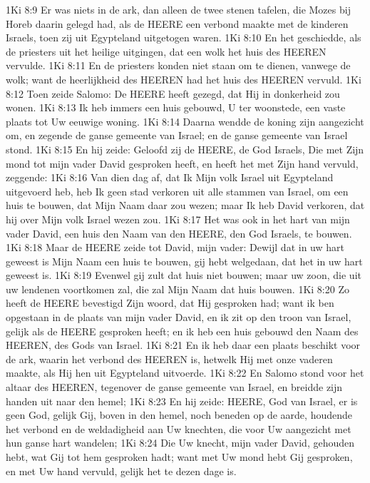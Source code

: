 1Ki 8:9  Er was niets in de ark, dan alleen de twee stenen tafelen, die Mozes bij Horeb daarin gelegd had, als de HEERE een verbond maakte met de kinderen Israels, toen zij uit Egypteland uitgetogen waren.
1Ki 8:10  En het geschiedde, als de priesters uit het heilige uitgingen, dat een wolk het huis des HEEREN vervulde.
1Ki 8:11  En de priesters konden niet staan om te dienen, vanwege de wolk; want de heerlijkheid des HEEREN had het huis des HEEREN vervuld.
1Ki 8:12  Toen zeide Salomo: De HEERE heeft gezegd, dat Hij in donkerheid zou wonen.
1Ki 8:13  Ik heb immers een huis gebouwd, U ter woonstede, een vaste plaats tot Uw eeuwige woning.
1Ki 8:14  Daarna wendde de koning zijn aangezicht om, en zegende de ganse gemeente van Israel; en de ganse gemeente van Israel stond.
1Ki 8:15  En hij zeide: Geloofd zij de HEERE, de God Israels, Die met Zijn mond tot mijn vader David gesproken heeft, en heeft het met Zijn hand vervuld, zeggende:
1Ki 8:16  Van dien dag af, dat Ik Mijn volk Israel uit Egypteland uitgevoerd heb, heb Ik geen stad verkoren uit alle stammen van Israel, om een huis te bouwen, dat Mijn Naam daar zou wezen; maar Ik heb David verkoren, dat hij over Mijn volk Israel wezen zou.
1Ki 8:17  Het was ook in het hart van mijn vader David, een huis den Naam van den HEERE, den God Israels, te bouwen.
1Ki 8:18  Maar de HEERE zeide tot David, mijn vader: Dewijl dat in uw hart geweest is Mijn Naam een huis te bouwen, gij hebt welgedaan, dat het in uw hart geweest is.
1Ki 8:19  Evenwel gij zult dat huis niet bouwen; maar uw zoon, die uit uw lendenen voortkomen zal, die zal Mijn Naam dat huis bouwen.
1Ki 8:20  Zo heeft de HEERE bevestigd Zijn woord, dat Hij gesproken had; want ik ben opgestaan in de plaats van mijn vader David, en ik zit op den troon van Israel, gelijk als de HEERE gesproken heeft; en ik heb een huis gebouwd den Naam des HEEREN, des Gods van Israel.
1Ki 8:21  En ik heb daar een plaats beschikt voor de ark, waarin het verbond des HEEREN is, hetwelk Hij met onze vaderen maakte, als Hij hen uit Egypteland uitvoerde.
1Ki 8:22  En Salomo stond voor het altaar des HEEREN, tegenover de ganse gemeente van Israel, en breidde zijn handen uit naar den hemel;
1Ki 8:23  En hij zeide: HEERE, God van Israel, er is geen God, gelijk Gij, boven in den hemel, noch beneden op de aarde, houdende het verbond en de weldadigheid aan Uw knechten, die voor Uw aangezicht met hun ganse hart wandelen;
1Ki 8:24  Die Uw knecht, mijn vader David, gehouden hebt, wat Gij tot hem gesproken hadt; want met Uw mond hebt Gij gesproken, en met Uw hand vervuld, gelijk het te dezen dage is.
